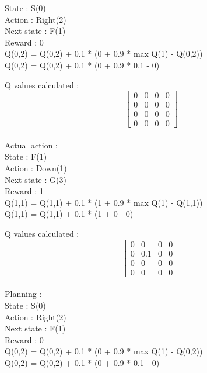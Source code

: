 \documentclass[12pt]{article}
\newenvironment{problem}[2][\large Problem]{\begin{trivlist}
\item[\hskip \labelsep {\bfseries #1}\hskip \labelsep {\bfseries #2.}]}{\end{trivlist}}
\begin{document}
\begin{problem} {4}
\begin{itemize}
State : S(0) \\ Action : Right(2) \\ Next state : F(1) \\ Reward : 0\\

\hspace*{20pt} Q(0,2) = Q(0,2) + 0.1 * (0 + 0.9 * max Q(1) - Q(0,2))\\
\hspace*{20pt} Q(0,2) = Q(0,2) + 0.1 * (0 + 0.9 * 0.1 - 0)

Q values calculated : 
\[\begin{bmatrix}
0 & 0 & 0 & 0\\
0 & 0 & 0 & 0\\
0 & 0 & 0 & 0\\
0 & 0 & 0 & 0
\end{bmatrix}\]\\

\hspace*{20pt} Actual action : \\

State : F(1) \\ Action : Down(1) \\ Next state : G(3) \\ Reward : 1\\

\hspace*{20pt} Q(1,1) = Q(1,1) + 0.1 * (1 + 0.9 * max Q(1) - Q(1,1))\\
\hspace*{20pt} Q(1,1) = Q(1,1) + 0.1 * (1 + 0 - 0)

Q values calculated : 
\[\begin{bmatrix}
0 & 0 & 0 & 0\\
0 & 0.1 & 0 & 0\\
0 & 0 & 0 & 0\\
0 & 0 & 0 & 0
\end{bmatrix}\]\\

\hspace*{20pt} Planning : \\

State : S(0) \\ Action : Right(2) \\ Next state : F(1) \\ Reward : 0\\

\hspace*{20pt} Q(0,2) = Q(0,2) + 0.1 * (0 + 0.9 * max Q(1) - Q(0,2))\\
\hspace*{20pt} Q(0,2) = Q(0,2) + 0.1 * (0 + 0.9 * 0.1 - 0)


\end{itemize}
\end{problem}
\end{document}
